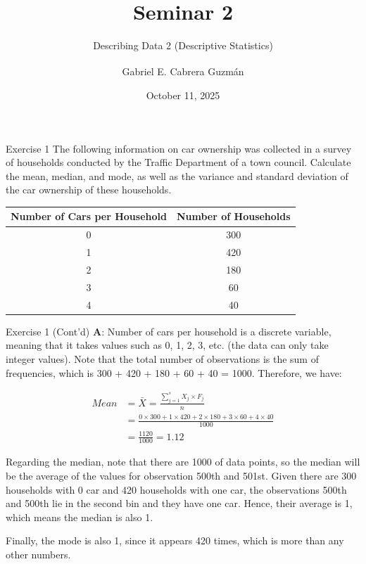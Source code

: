 \documentclass[
  ignorenonframetext,
  aspectratio=43,
]{beamer}
\title[Seminar 2]{Seminar
2\daggerfootnote{\texttt{gabriel.cabreraguzman@postgrad.manchester.ac.uk}}}
\subtitle{Describing Data 2 (Descriptive Statistics)}
\author[Gabriel E. Cabrera Guzmán]{
    {Gabriel E. Cabrera
Guzmán\textsuperscript{\normalsize\orcidlink{0000-0000-0000-0000}}} \medskip
}
\date{October 11, 2025}
\institute[]{
    The University of Manchester\\
Alliance Manchester Business School \bigskip
}
\begin{document}
\frame{\titlepage}
\ifdefined\Shaded\renewenvironment{Shaded}{\begin{tcolorbox}[borderline west={3pt}{0pt}{shadecolor}, interior hidden, boxrule=0pt, enhanced, breakable, frame hidden, sharp corners]}{\end{tcolorbox}}\fi

\begin{frame}{Exercise 1}
\protect\hypertarget{exercise-1}{}
The following information on car ownership was collected in a survey of
households conducted by the Traffic Department of a town council.
Calculate the mean, median, and mode, as well as the variance and
standard deviation of the car ownership of these households.
\vspace{10pt}

\begin{longtable}[]{@{}cc@{}}
\toprule()
Number of Cars per Household & Number of Households \\
\midrule()
\endhead
0 & 300 \\
1 & 420 \\
2 & 180 \\
3 & 60 \\
4 & 40 \\
\bottomrule()
\end{longtable}
\end{frame}

\begin{frame}{Exercise 1 (Cont'd)}
\protect\hypertarget{exercise-1-contd}{}
\textbf{A}: Number of cars per household is a discrete variable, meaning
that it takes values such as 0, 1, 2, 3, etc. (the data can only take
integer values). Note that the total number of observations is the sum
of frequencies, which is 300 + 420 + 180 + 60 + 40 = 1000. Therefore, we
have:

\vspace{-10pt}

\[
\begin{aligned}
Mean        & = \bar{X} = \frac{\sum^{s}_{j=1}X_j \times F_j}{n} \\
            & = \frac{0 \times 300 + 1 \times 420 + 2 \times 180 + 3 \times 60 + 4 \times 40}{1000} \\
            & = \frac{1120}{1000} = 1.12
\end{aligned}
\]
\end{frame}

\begin{frame}{}
\protect\hypertarget{section}{}
Regarding the median, note that there are 1000 of data points, so the
median will be the average of the values for observation 500th and
501st. Given there are 300 households with 0 car and 420 households with
one car, the observations 500th and 500th lie in the second bin and they
have one car. Hence, their average is 1, which means the median is also
1.

Finally, the mode is also 1, since it appears 420 times, which is more
than any other numbers.
\end{frame}
\end{document}
